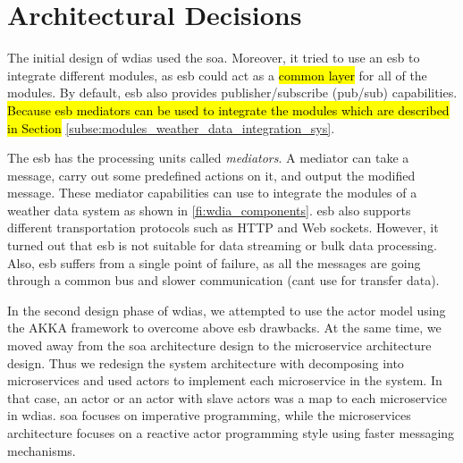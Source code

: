 \section{Architectural Decisions}
\label{se:architectural_decisions}

The initial design of \acrshort{wdias} used the \acrfull{soa}. Moreover, it tried to use an \acrfull{esb} to integrate different modules, as \acrshort{esb} could act as a \hl{common layer} for all of the modules. By default, \acrshort{esb} also provides publisher/subscribe (pub/sub) capabilities.
\hl{Because \acrshort{esb} mediators can be used to integrate the modules which are described in Section} \ref{subse:modules_weather_data_integration_sys}. 

The \acrshort{esb} has the processing units called \emph{mediators}. A mediator can take a message, carry out some predefined actions on it, and output the modified message. These mediator capabilities can use to integrate the modules of a weather data system as shown in \cref{fi:wdia_components}. \acrshort{esb} also supports different transportation protocols such as HTTP and Web sockets. However, it turned out that \acrshort{esb} is not suitable for data streaming or bulk data processing. Also, \acrshort{esb} suffers from a single point of failure, as all the messages are going through a common bus and slower communication (cant use for transfer data).

In the second design phase of \acrshort{wdias}, we attempted to use the actor model using the AKKA framework \cite{HewittWhyModel} to overcome above \acrshort{esb} drawbacks. At the same time, we moved away from the \acrshort{soa} architecture design to the microservice architecture design. Thus we redesign the system architecture with decomposing into microservices and used actors to implement each microservice in the system. In that case, an actor or an actor with slave actors was a map to each microservice in \acrshort{wdias}. \acrshort{soa} focuses on imperative programming, while the microservices architecture focuses on a reactive actor programming style using faster messaging mechanisms. 

